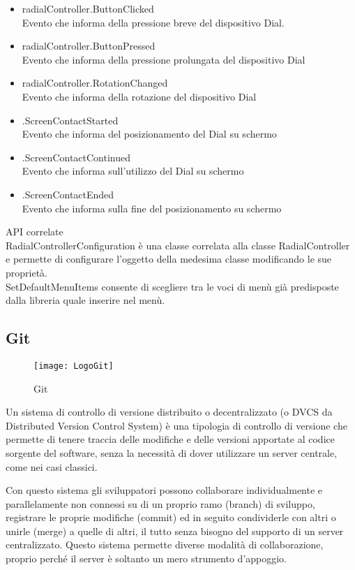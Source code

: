 \begin{itemize}
\item radialController.ButtonClicked\\
Evento che informa della pressione breve del dispositivo Dial.
\item radialController.ButtonPressed\\
Evento che informa della pressione prolungata del dispositivo Dial
\item radialController.RotationChanged\\
Evento che informa della rotazione del dispositivo Dial
\item .ScreenContactStarted\\
Evento che informa del posizionamento del Dial su schermo
\item .ScreenContactContinued\\
Evento che informa sull’utilizzo del Dial su schermo
\item .ScreenContactEnded\\
Evento che informa sulla fine del posizionamento su schermo
\end{itemize}
API correlate\\
RadialControllerConfiguration è una classe correlata alla classe RadialController e permette di configurare l’oggetto della medesima classe modificando le sue proprietà.\\
SetDefaultMenuItems consente di scegliere tra le voci di menù già predisposte dalla libreria quale inserire nel menù.

\subsection{Git}
\begin{figure}[htpb!]
\center
  \texttt{[image: LogoGit]}
  \caption{Git}
\end{figure}
Un sistema di controllo di versione distribuito o decentralizzato (o DVCS da Distributed Version Control System) è una tipologia di controllo di versione che permette di tenere traccia delle modifiche e delle versioni apportate al codice sorgente del software, senza la necessità di dover utilizzare un server centrale, come nei casi classici.

Con questo sistema gli sviluppatori possono collaborare individualmente e parallelamente non connessi su di un proprio ramo (branch) di sviluppo, registrare le proprie modifiche (commit) ed in seguito condividerle con altri o unirle (merge) a quelle di altri, il tutto senza bisogno del supporto di un server centralizzato. Questo sistema permette diverse modalità di collaborazione, proprio perché il server è soltanto un mero strumento d'appoggio.

